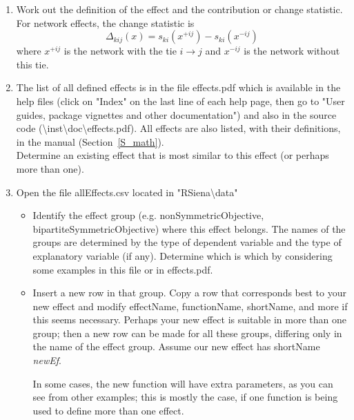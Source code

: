 \documentclass[a4paper,fleqn,11pt]{article}
\newcommand{\+}{\, + \,}
\begin{document}
{\begin{enumerate}
\item Work out the definition of the effect and the contribution or
      change statistic.
      For network effects, the change statistic is
      \begin{equation}
      \Delta_{kij} (x) =  s_{ki}(x^{+ij}) -     s_{ki}(x^{-ij})  \label{changestat}
      \end{equation}
      where $x^{+ij}$ is the network with the tie $i \rightarrow j$
      and $x^{-ij}$ is the network without this tie.
\item The list of all defined effects is in the file effects.pdf which is available
      in the help files (click on "Index" on the last line of each help page, then go to
      "User guides, package vignettes and other documentation") and also in the source
      code ({\textbackslash}inst{\textbackslash}doc{\textbackslash}effects.pdf).
      All effects are also listed, with their definitions, in the manual (Section~\ref{S_math}). \\
      Determine an existing effect that is most similar
      to this effect (or perhaps more than one).
\item Open the file \textsf{allEffects.csv} located in
       \textsf{"RSiena\textbackslash data"}
	   \begin{itemize}
		\item Identify the effect group
               (e.g. nonSymmetricObjective,  bipartiteSymmetricObjective)
              where this effect belongs.
              The names of the groups are determined by the type of dependent
              variable and the type of explanatory variable (if any).
              Determine which is which by considering some examples
              in this file or in effects.pdf.
    	\item Insert a new row in that group.
              Copy a row that corresponds best to your new effect
              and modify effectName, functionName, shortName,
              and more if this seems necessary.
              Perhaps your new effect is suitable in more than one group;
              then a new row can be made for all these groups, differing only
              in the name of the effect group.
              Assume our new effect has shortName \textit{newEf}.

              In some cases, the new function will have extra parameters,
              as you can see from other examples;
              this is mostly the case, if one function is being used to define
              more than one effect.


\end{itemize}
\end{enumerate}}
\end{document}
